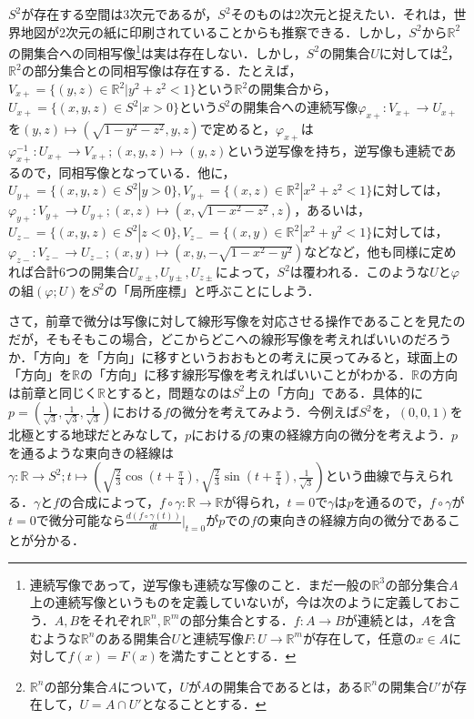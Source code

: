 \documentclass{jsarticle}
\def\realnum{{\mathbb R}}
\def\dfrac{\displaystyle\frac}
\begin{document}
$S^2$が存在する空間は3次元であるが，$S^2$そのものは2次元と捉えたい．それは，世界地図が2次元の紙に印刷されていることからも推察できる．しかし，$S^2$から$\realnum^2$の開集合への同相写像\footnote{連続写像であって，逆写像も連続な写像のこと．まだ一般の$\realnum^3$の部分集合$A$上の連続写像というものを定義していないが，今は次のように定義しておこう．$A,B$をそれぞれ$\realnum^n,\realnum^m$の部分集合とする．$f:A\rightarrow B$が連続とは，$A$を含むような$\realnum^n$のある開集合$U$と連続写像$F:U\rightarrow \realnum^m$が存在して，任意の$x\in A$に対して$f(x)=F(x)$を満たすこととする．}は実は存在しない．しかし，$S^2$の開集合$U$に対しては\footnote{$\realnum^n$の部分集合$A$について，$U$が$A$の開集合であるとは，ある$\realnum^n$の開集合$U'$が存在して，$U=A\cap U'$となることとする．}，$\realnum^2$の部分集合との同相写像は存在する．たとえば，$V_{x+}=\{(y,z)\in \realnum^2|y^2+z^2<1\}$という$\realnum^2$の開集合から，$U_{x+}=\{(x,y,z)\in S^2|x>0\}$という$S^2$の開集合への連続写像$\varphi_{x+}:V_{x+}\rightarrow U_{x+}$を$(y,z)\mapsto (\sqrt{1-y^2-z^2},y,z)$で定めると，$\varphi_{x+}$は$\varphi_{x+}^{-1}:U_{x+}\rightarrow V_{x+};(x,y,z)\mapsto (y,z)$という逆写像を持ち，逆写像も連続であるので，同相写像となっている．他に，$U_{y+}=\{(x,y,z)\in S^2|y>0\},V_{y+}=\{(x,z)\in\realnum^2|x^2+z^2<1\}$に対しては，$\varphi_{y+}:V_{y+}\rightarrow U_{y+};(x,z)\mapsto (x,\sqrt{1-x^2-z^2},z)$，あるいは，$U_{z-}=\{(x,y,z)\in S^2|z<0\},V_{z-}=\{(x,y)\in\realnum^2|x^2+y^2<1\}$に対しては，$\varphi_{z-}:V_{z-}\rightarrow U_{z-};(x,y)\mapsto (x,y,-\sqrt{1-x^2-y^2})$などなど，他も同様に定めれば合計$6$つの開集合$U_{x\pm},U_{y\pm},U_{z\pm}$によって，$S^2$は覆われる．このような$U$と$\varphi$の組$(\varphi;U)$を$S^2$の「局所座標」と呼ぶことにしよう．


さて，前章で微分は写像に対して線形写像を対応させる操作であることを見たのだが，そもそもこの場合，どこからどこへの線形写像を考えればいいのだろうか．「方向」を「方向」に移すというおおもとの考えに戻ってみると，球面上の「方向」を$\realnum$の「方向」に移す線形写像を考えればいいことがわかる．$\realnum$の方向は前章と同じく$\realnum$とすると，問題なのは$S^2$上の「方向」である．具体的に$p=(\frac{1}{\sqrt{3}},\frac{1}{\sqrt{3}},\frac{1}{\sqrt{3}})$における$f$の微分を考えてみよう．今例えば$S^2$を，$(0,0,1)$を北極とする地球だとみなして，$p$における$f$の東の経線方向の微分を考えよう．$p$を通るような東向きの経線は$\gamma:\realnum\rightarrow S^2;t\mapsto(\sqrt{\frac{2}{3}}\cos(t+\frac{\pi}{4}),\sqrt{\frac{2}{3}}\sin(t+\frac{\pi}{4}),\frac{1}{\sqrt{3}})$という曲線で与えられる．$\gamma$と$f$の合成によって，$f\circ \gamma:\realnum\rightarrow\realnum$が得られ，$t=0$で$\gamma$は$p$を通るので，$f\circ\gamma$が$t=0$で微分可能なら$\dfrac{d(f\circ\gamma(t))}{dt}\Big|_{t=0}$が$p$での$f$の東向きの経線方向の微分であることが分かる．
\end{document}
